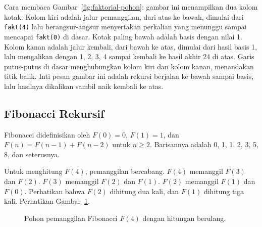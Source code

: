 \documentclass[11pt,a4paper]{article}
\begin{document}
Cara membaca Gambar~\ref{fig:faktorial-pohon}: gambar ini menampilkan dua kolom kotak. Kolom kiri adalah jalur pemanggilan, dari atas ke bawah, dimulai dari \texttt{fakt(4)} lalu berangsur-angsur menyertakan perkalian yang menunggu sampai mencapai \texttt{fakt(0)} di dasar. Kotak paling bawah adalah basis dengan nilai 1. Kolom kanan adalah jalur kembali, dari bawah ke atas, dimulai dari hasil basis 1, lalu mengalikan dengan 1, 2, 3, 4 sampai kembali ke hasil akhir 24 di atas. Garis putus-putus di dasar menghubungkan kolom kiri dan kolom kanan, menandakan titik balik. Inti pesan gambar ini adalah rekursi berjalan ke bawah sampai basis, lalu hasilnya dikalikan sambil naik kembali ke atas.

\subsection{Fibonacci Rekursif}

Fibonacci didefinisikan oleh $F(0)=0$, $F(1)=1$, dan $F(n)=F(n-1)+F(n-2)$ untuk $n \ge 2$. Barisannya adalah 0, 1, 1, 2, 3, 5, 8, dan seterusnya.

Untuk menghitung $F(4)$, pemanggilan bercabang. $F(4)$ memanggil $F(3)$ dan $F(2)$. $F(3)$ memanggil $F(2)$ dan $F(1)$. $F(2)$ memanggil $F(1)$ dan $F(0)$. Perhatikan bahwa $F(2)$ dihitung dua kali, dan $F(1)$ dihitung tiga kali. Perhatikan Gambar~\ref{fig:fibonacci-pohon}.

\begin{figure}[H]
	\centering
	\caption{Pohon pemanggilan Fibonacci $F(4)$ dengan hitungan berulang.}
	\label{fig:fibonacci-pohon}
\end{figure}
\end{document}
